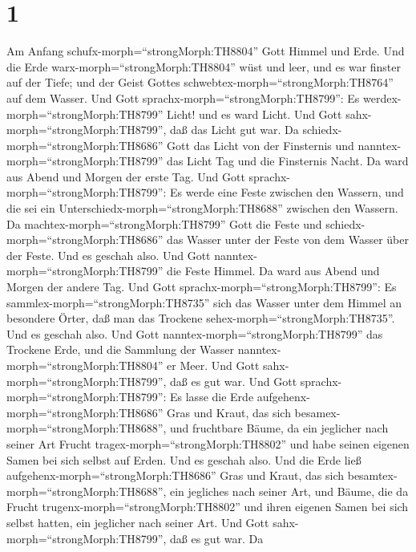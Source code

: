 \hypertarget{section}{%
\section{1}\label{section}}

 Am Anfang schufx-morph=``strongMorph:TH8804'' Gott Himmel
und Erde.  Und die Erde warx-morph=``strongMorph:TH8804''
wüst und leer, und es war finster auf der Tiefe; und der Geist Gottes
schwebtex-morph=``strongMorph:TH8764'' auf dem Wasser.  Und
Gott sprachx-morph=``strongMorph:TH8799'': Es
werdex-morph=``strongMorph:TH8799'' Licht! und es ward Licht.
 Und Gott sahx-morph=``strongMorph:TH8799'', daß das Licht
gut war. Da schiedx-morph=``strongMorph:TH8686'' Gott das Licht von der
Finsternis  und nanntex-morph=``strongMorph:TH8799'' das
Licht Tag und die Finsternis Nacht. Da ward aus Abend und Morgen der
erste Tag.  Und Gott sprachx-morph=``strongMorph:TH8799'':
Es werde eine Feste zwischen den Wassern, und die sei ein
Unterschiedx-morph=``strongMorph:TH8688'' zwischen den Wassern.
 Da machtex-morph=``strongMorph:TH8799'' Gott die Feste und
schiedx-morph=``strongMorph:TH8686'' das Wasser unter der Feste von dem
Wasser über der Feste. Und es geschah also.  Und Gott
nanntex-morph=``strongMorph:TH8799'' die Feste Himmel. Da ward aus Abend
und Morgen der andere Tag.  Und Gott
sprachx-morph=``strongMorph:TH8799'': Es
sammlex-morph=``strongMorph:TH8735'' sich das Wasser unter dem Himmel an
besondere Örter, daß man das Trockene
sehex-morph=``strongMorph:TH8735''. Und es geschah also. 
Und Gott nanntex-morph=``strongMorph:TH8799'' das Trockene Erde, und die
Sammlung der Wasser nanntex-morph=``strongMorph:TH8804'' er Meer. Und
Gott sahx-morph=``strongMorph:TH8799'', daß es gut war. 
Und Gott sprachx-morph=``strongMorph:TH8799'': Es lasse die Erde
aufgehenx-morph=``strongMorph:TH8686'' Gras und Kraut, das sich
besamex-morph=``strongMorph:TH8688'', und fruchtbare Bäume, da ein
jeglicher nach seiner Art Frucht tragex-morph=``strongMorph:TH8802'' und
habe seinen eigenen Samen bei sich selbst auf Erden. Und es geschah
also.  Und die Erde ließ
aufgehenx-morph=``strongMorph:TH8686'' Gras und Kraut, das sich
besamtex-morph=``strongMorph:TH8688'', ein jegliches nach seiner Art,
und Bäume, die da Frucht trugenx-morph=``strongMorph:TH8802'' und ihren
eigenen Samen bei sich selbst hatten, ein jeglicher nach seiner Art. Und
Gott sahx-morph=``strongMorph:TH8799'', daß es gut war.  Da
